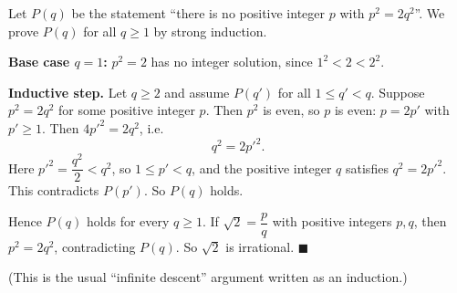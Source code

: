 Let $P(q)$ be the statement ``there is no positive integer $p$ with $p^2=2q^2$''. We prove $P(q)$ for all $q\ge1$ by strong induction.

\textbf{Base case $q=1$:} $p^2=2$ has no integer solution, since $1^2<2<2^2$.

\textbf{Inductive step.} Let $q\ge2$ and assume $P(q')$ for all $1\le q'<q$. Suppose $p^2=2q^2$ for some positive integer $p$. Then $p^2$ is even, so $p$ is even: $p=2p'$ with $p'\ge1$. Then $4p'^2=2q^2$, i.e.
\[q^2=2p'^2.\]
Here $p'^2=\dfrac{q^2}{2}<q^2$, so $1\le p'<q$, and the positive integer $q$ satisfies $q^2=2p'^2$. This contradicts $P(p')$. So $P(q)$ holds.

Hence $P(q)$ holds for every $q\ge1$. If $\sqrt2=\dfrac pq$ with positive integers $p,q$, then $p^2=2q^2$, contradicting $P(q)$. So $\sqrt2$ is irrational. $\blacksquare$

(This is the usual ``infinite descent'' argument written as an induction.)
